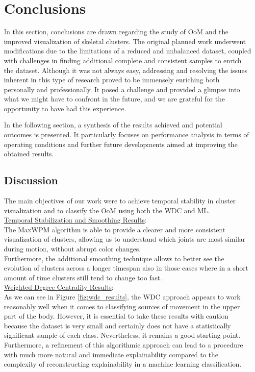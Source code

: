 \chapter{Conclusions}
In this section, conclusions are drawn regarding the study of OoM and the improved visualization of skeletal clusters.
The original planned work underwent modifications due to the limitations of a reduced and unbalanced dataset, coupled with challenges in finding additional complete and consistent samples to enrich the dataset.
Although it was not always easy, addressing and resolving the issues inherent in this type of research proved to be immensely enriching both personally and professionally.
It posed a challenge and provided a glimpse into what we might have to confront in the future, and we are grateful for the opportunity to have had this experience.

In the following section, a synthesis of the results achieved and potential outcomes is presented.
It particularly focuses on performance analysis in terms of operating conditions and further future developments aimed at improving the obtained results.

\section{Discussion}
The main objectives of our work were to achieve temporal stability in cluster visualization and to classify the OoM using both the WDC and ML.\\

\underline{Temporal Stabilization and Smoothing Results}:\\
The MaxWPM algorithm is able to provide a clearer and more consistent visualization of clusters, allowing us to understand which joints are most similar during motion, without abrupt color changes. \\
Furthermore, the additional smoothing technique allows to better see the evolution of clusters across a longer timespan also in those cases where in a short amount of time clusters still tend to change too fast.\\

\underline{Weighted Degree Centrality Results}:\\
As we can see in Figure \ref*{fig:wdc_results}, the WDC approach appears to work reasonably well when it comes to classifying sources of movement in the upper part of the body. 
However, it is essential to take these results with caution because the dataset is very small and certainly does not have a statistically significant sample of each class. 
Nevertheless, it remains a good starting point. \\
Furthermore, a refinement of this algorithmic approach can lead to a procedure with much more natural and immediate explainability 
compared to the complexity of reconstructing explainability in a machine learning classification.\\


